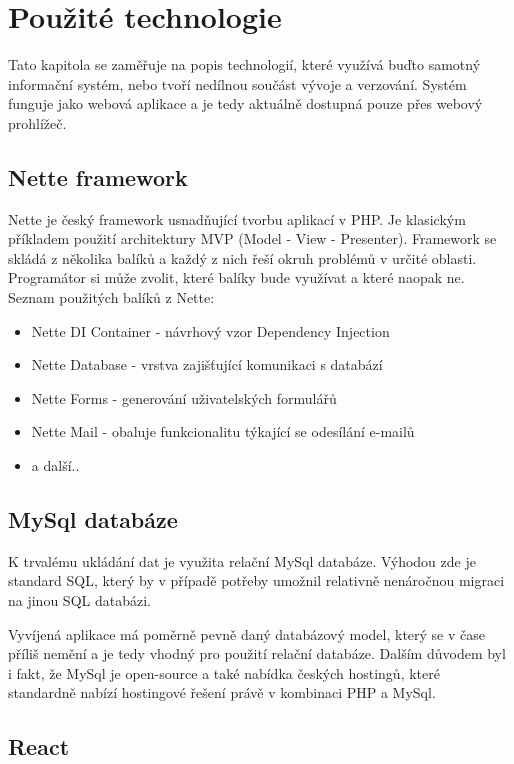 \chapter{Použité technologie}
Tato kapitola se zaměřuje na popis technologií, které využívá buďto samotný informační systém, nebo tvoří nedílnou součást vývoje a verzování. Systém funguje jako webová aplikace a je tedy aktuálně dostupná pouze přes webový prohlížeč.

\section{Nette framework}

Nette je český framework usnadňující tvorbu aplikací v PHP. Je klasickým příkladem použití architektury MVP (Model - View - Presenter). \cite{nette-itnetwork} Framework se skládá z několika balíků a každý z nich řeší okruh problémů v určité oblasti. Programátor si může zvolit, které balíky bude využívat a které naopak ne. 
Seznam použitých balíků z Nette:
\begin{itemize}
  \item Nette DI Container - návrhový vzor Dependency Injection
  \item Nette Database - vrstva zajišťující komunikaci s databází
  \item Nette Forms - generování uživatelských formulářů
  \item Nette Mail - obaluje funkcionalitu týkající se odesílání e-mailů
  \item a další..
\end{itemize}

\section{MySql databáze}

K trvalému ukládání dat je využita relační MySql databáze. Výhodou zde je standard SQL, který by v případě potřeby umožnil relativně nenáročnou migraci na jinou SQL databázi.


Vyvíjená aplikace má poměrně pevně daný databázový model, který se v čase příliš nemění a je tedy vhodný pro použití relační databáze. Dalším důvodem byl i fakt, že MySql je open-source a také nabídka českých hostingů, které standardně nabízí hostingové řešení právě v kombinaci PHP a MySql.

\section{React}

